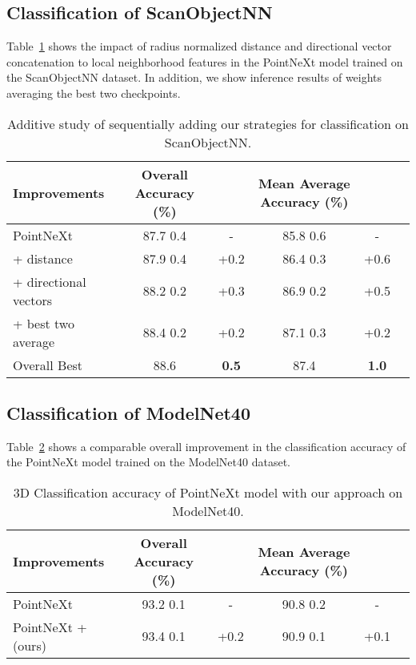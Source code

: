 \documentclass[runningheads]{llncs}
\begin{document}
\subsection{Classification of ScanObjectNN}

Table~\ref{tab1} shows the impact of radius normalized distance and directional vector concatenation to local neighborhood features in the PointNeXt model trained on the ScanObjectNN dataset. In addition, we show inference results of weights averaging the best two checkpoints.
\vspace{-1em}
\begin{table}
\centering
\caption{Additive study of sequentially adding our strategies for classification on ScanObjectNN.}\label{tab1}
\begin{tabular}{|l|c|c|c|c|c|}
\hline
Improvements &  Overall Accuracy (\%)&  & Mean Average Accuracy (\%)&\\
\hline
PointNeXt~\cite{PointNeXt} & 87.7  0.4 & - &85.8  0.6& - \\
+ distance & 87.9  0.4 & +0.2& 86.4  0.3& +0.6\\
+ directional vectors & 88.2  0.2 & +0.3& 86.9  0.2& +0.5 \\
+ best two average & 88.4  0.2 & +0.2&87.1  0.3& +0.2 \\ 
\hline
Overall Best & 88.6 & \textbf{0.5}  & 87.4 & \textbf{1.0} \\
\hline
\end{tabular}
\end{table}
\vspace{-1em}
\subsection{Classification of ModelNet40}
Table~\ref{tab2} shows a comparable overall improvement in the classification accuracy of the PointNeXt model trained on the ModelNet40 dataset.
\begin{table}
\centering
\caption{ 3D Classification accuracy of PointNeXt model with our approach on ModelNet40.}\label{tab2}
\begin{tabular}{|l|c|c|c|c|c|}
\hline
Improvements &  Overall Accuracy (\%)&  & Mean Average Accuracy (\%)&\\
\hline
PointNeXt~\cite{PointNeXt} & 93.2  0.1 & - &90.8  0.2& - \\
PointNeXt + (ours) & 93.4  0.1 & +0.2 & 90.9  0.1 & +0.1\\
\hline
\end{tabular}
\end{table}
\vspace{-1em}
\end{document}
